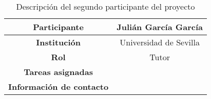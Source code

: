 \begin{table}[H]
    \centering
    \begin{tabular}{|c|c|}
    \hline
    \textbf{Participante} & Julián García García \\
    \hline
    \textbf{Institución} & Universidad de Sevilla \\
    \hline
    \textbf{Rol} & Tutor \\
    \hline
    \textbf{Tareas asignadas} & \\
    \hline
    \textbf{Información de contacto} & \\
    \hline
    \end{tabular}
\caption{Descripción del segundo participante del proyecto}
\label{tab:trazabilidadAlum}
\end{table}